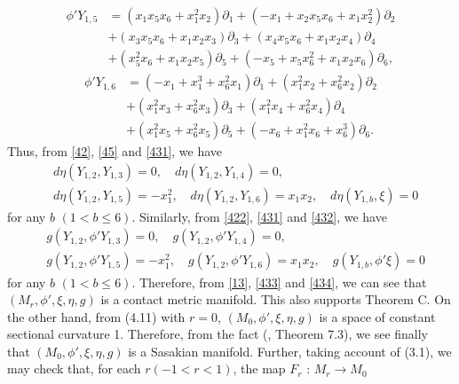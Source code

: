 \documentclass[12pt]{article}
\numberwithin{equation}{section}
\begin{document}
\begin{equation*}
\begin{split}
\phi 'Y_{1,
5}&=(x_1x_5x_6+x_1^2x_2)\partial_1+(-x_1+x_2x_5x_6+x_1x_2^2)\partial_2\\
&+(x_3x_5x_6+x_1x_2x_3)\partial_3+(x_4x_5x_6+x_1x_2x_4)\partial_4\\
&+(x_5^2x_6+x_1x_2x_5)\partial_5+(-x_5+x_5x_6^2+x_1x_2x_6)\partial_6,
\end{split}
\end{equation*}
\begin{equation*}
\begin{split}
\phi 'Y_{1,
6}&=(-x_1+x_1^3+x_6^2x_1)\partial_1+(x_1^2x_2+x_6^2x_2)\partial_2\\
&+(x_1^2x_3+x_6^2x_3)\partial_3+(x_1^2x_4+x_6^2x_4)\partial_4\\
&+(x_1^2x_5+x_6^2x_5)\partial_5+(-x_6+x_1^2x_6+x_6^3)\partial_6.
\end{split}
\end{equation*}
Thus, from \eqref{42}, \eqref{45} and \eqref{431}, we have
\begin{equation}\label{433}
\begin{split}
&d\eta(Y_{1, 2}, Y_{1, 3})=0,\quad d\eta(Y_{1, 2}, Y_{1, 4})=0,\\
&d\eta(Y_{1, 2}, Y_{1, 5})=-x_1^2,\quad d\eta(Y_{1, 2}, Y_{1,
6})=x_1x_2,\quad d\eta(Y_{1, b}, \xi)=0
\end{split}
\end{equation}
for any $b$ $(1 < b \leq 6)$. Similarly, from \eqref{422},
\eqref{431} and \eqref{432}, we have
\begin{equation}\label{434}
\begin{split}
&g(Y_{1, 2}, \phi 'Y_{1, 3})=0, \quad g(Y_{1, 2}, \phi 'Y_{1,
4})=0,\\
&g(Y_{1, 2}, \phi 'Y_{1, 5})=-x_1^2, \quad g(Y_{1, 2}, \phi 'Y_{1,
6})=x_1x_2, \quad g(Y_{1, b}, \phi '\xi)=0
\end{split}
\end{equation}
for any $b$ $(1 < b \leq 6)$. Therefore, from \eqref{13},
\eqref{433} and \eqref{434}, we can see that $(M_{r}, \phi ', \xi, \eta,
g)$ is a contact metric manifold. This also supports Theorem C. On the other hand, from (4.11) with $r=0$, $(M_{0}, \phi ', \xi,
\eta,g)$ is a space of constant sectional curvature 1. Therefore,
from the fact (\cite{B1}, Theorem 7.3), we see finally that
$(M_{0}, \phi ', \xi, \eta,g)$ is a Sasakian manifold. Further, taking account
of (3.1), we may check that, for each $r(-1<r<1)$, the map $F_{r}$ : $M_{r} \rightarrow M_{0}$
\end{document}
